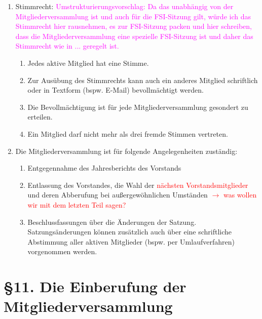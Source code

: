 \documentclass[a4paper,12pt]{article}
\newcommand{\red}[1]{\textcolor{red}{#1}}
\begin{document}
\begin{enumerate}
	\item
		\label{10.1_Stimmrecht}
		Stimmrecht: \textcolor{magenta}{Umstrukturierungsvorschlag: Da das unabhängig von der Mitgliederversammlung ist und auch für die FSI-Sitzung gilt, würde ich das Stimmrecht hier rausnehmen, es zur FSI-Sitzung packen und hier schreiben, dass die Mitgliederversammlung eine spezielle FSI-Sitzung ist und daher das Stimmrecht wie in ... geregelt ist.}
		\begin{enumerate}[label=(\roman*)]
        		\item
				Jedes aktive Mitglied hat eine Stimme.
        		\item
				Zur Ausübung des Stimmrechts kann auch ein
				anderes Mitglied schriftlich oder in Textform
				(bspw. E-Mail) bevollmächtigt werden.
        		\item
				Die Bevollmächtigung ist für jede
				Mitgliederversammlung gesondert zu erteilen.
        		\item
				Ein Mitglied darf nicht mehr als drei
				fremde Stimmen vertreten.
    		\end{enumerate}
    	\item
		Die Mitgliederversammlung ist für folgende Angelegenheiten
		zuständig:
		\begin{enumerate}[label=(\roman*)]
			\item
				Entgegennahme des Jahresberichts des Vorstands
			\item
				Entlassung des Vorstandes, die Wahl der \red{nächsten Vorstandsmitglieder}
				und deren Abberufung bei außergewöhnlichen
				Umständen \red{$\rightarrow$ was wollen wir mit dem letzten Teil sagen?}
			\item
				Beschlussfassungen über die Änderungen der
				Satzung. Satzungsänderungen können zusätzlich
				auch über eine schriftliche Abstimmung aller
				aktiven Mitglieder (bspw. per Umlaufverfahren)
				vorgenommen werden.
		\end{enumerate}
\end{enumerate}

\section*{§11. Die Einberufung der Mitgliederversammlung}
\end{document}
